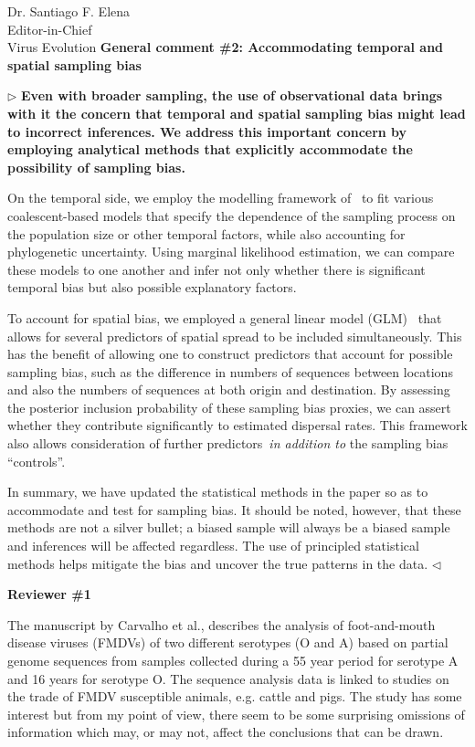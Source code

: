 \documentclass[12pt, a4paper]{letter} %
\newenvironment{reply}{$\triangleright$\bf}{$\triangleleft$}
\begin{document}
\begin{letter}{
	Dr. Santiago F. Elena\\
    Editor-in-Chief \\
    Virus Evolution
}
\textbf{General comment \#2: Accommodating temporal and spatial sampling bias}

\begin{reply}
Even with broader sampling, the use of observational data brings with it the concern that temporal and spatial sampling bias might lead to incorrect inferences.
We address this important concern by employing analytical methods that explicitly accommodate the possibility of sampling bias.

On the temporal side, we employ the modelling framework of~\cite{Karcher2020} to fit various coalescent-based models that specify the dependence of the sampling process on the population size or other temporal factors, while also accounting for phylogenetic uncertainty.
Using marginal likelihood estimation, we can compare these models to one another and infer not only whether there is significant temporal bias but also possible explanatory factors.

To account for spatial bias, we employed a general linear model (GLM)~\citep{Lemey2014,Dudas2017} that allows for several predictors of spatial spread to be included simultaneously.
This has the benefit of allowing one to construct predictors that account for possible sampling bias, such as the difference in numbers of sequences between locations and also the numbers of sequences at both origin and destination.
By assessing the posterior inclusion probability of these sampling bias proxies, we can assert whether they contribute significantly to estimated dispersal rates.
This framework also allows consideration of further predictors~\textit{in addition to} the sampling bias ``controls''.

In summary, we have updated the statistical methods in the paper so as to accommodate and test for sampling bias.
It should be noted, however, that these methods are not a silver bullet; a biased sample will always be a biased sample and inferences will be affected regardless.
The use of principled statistical methods helps mitigate the bias and uncover the true patterns in the data.
\end{reply}

\textbf{Reviewer \#1}

The manuscript by Carvalho et al., describes the analysis of foot-and-mouth disease viruses (FMDVs) of two different serotypes (O and A) based on partial genome sequences from samples collected during a 55 year period for serotype A and 16 years for serotype O. 
The sequence analysis data is linked to studies on the trade of FMDV susceptible animals, e.g. cattle and pigs. 
The study has some interest but from my point of view, there seem to be some surprising omissions of information which may, or may not, affect the conclusions that can be drawn.


\end{letter}
\end{document}
